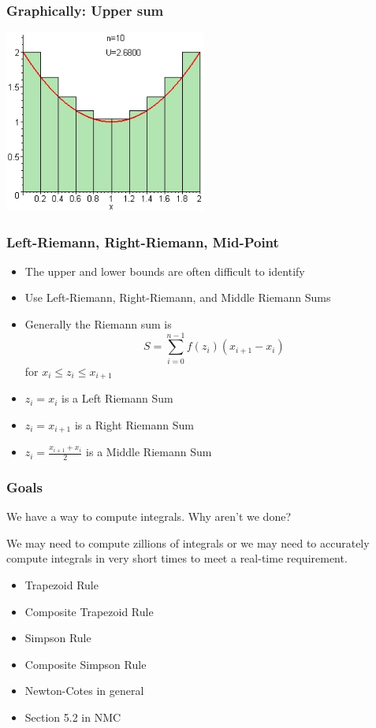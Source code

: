 \documentclass[10pt]{beamer}
\begin{document}
\begin{frame}
\frametitle{Graphically: Upper sum}
\begin{center}
  \includegraphics[height=6cm]{./figs/uppersum}
\end{center}
\end{frame}
\begin{frame}
\frametitle{Left-Riemann, Right-Riemann, Mid-Point}
\begin{itemize}
  \item The upper and lower bounds are often difficult to identify
  \item Use Left-Riemann, Right-Riemann, and Middle Riemann Sums
  \item Generally the Riemann sum is
\begin{equation*}
  S = \sum_{i=0}^{n-1} f(z_i)(x_{i+1}-x_{i})
\end{equation*}
  for $x_i \le z_i \le x_{i+1}$
  \item $z_i = x_i$ is a Left Riemann Sum
  \item $z_i = x_{i+1}$ is a Right Riemann Sum
  \item $z_i = \frac{x_{i+1}+x_{i}}{2}$ is a Middle Riemann Sum
\end{itemize}
\end{frame}
\begin{frame}
\frametitle{Goals}
We have a way to compute integrals.  Why aren't we done?

We may need to compute zillions of integrals or we may need to
accurately compute integrals in very short times to meet a real-time
requirement. 

\begin{itemize}
  \item Trapezoid Rule
  \item Composite Trapezoid Rule
  \item Simpson Rule
  \item Composite Simpson Rule
  \item Newton-Cotes in general
  \item Section 5.2 in NMC
\end{itemize}
\end{frame}
\end{document}
